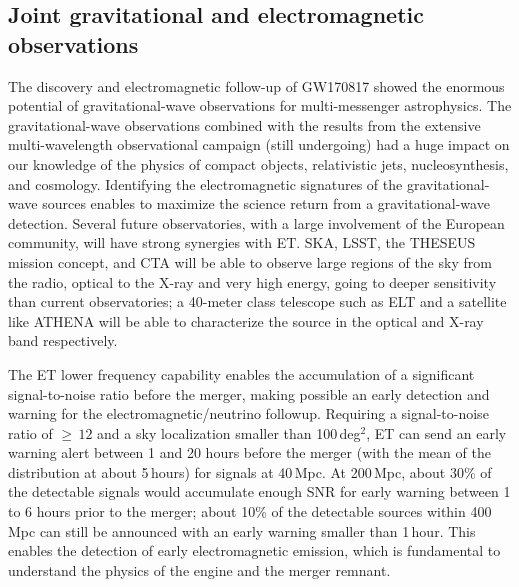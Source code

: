 \subsection{Joint gravitational and electromagnetic observations}
\label{sec:MM-EM}

The discovery and electromagnetic follow-up of GW170817 showed the enormous potential  of gravitational-wave observations for multi-messenger astrophysics. The gravitational-wave observations combined with the results from the extensive multi-wavelength observational campaign (still undergoing) had a huge impact on our knowledge of the physics of compact objects, relativistic jets, nucleosynthesis, and cosmology. Identifying the electromagnetic signatures of the gravitational-wave sources enables to maximize the science return from a gravitational-wave detection.  
Several future observatories, with a large involvement of the European community, will have strong synergies with ET. SKA, LSST, the THESEUS mission concept, and CTA will be able to observe large regions of the sky from the radio, optical to the X-ray and very high energy, going to deeper sensitivity than current observatories; a 40-meter class telescope such as ELT and a satellite like ATHENA will be able to characterize the source in the optical and X-ray band respectively. 

The ET lower frequency capability enables 
the accumulation of a significant signal-to-noise ratio before the merger, making possible an early detection and warning for the electromagnetic/neutrino followup. Requiring a signal-to-noise ratio of $\geq\,12$ and a sky localization smaller than 100\,deg$^2$, ET can send an early warning alert between 1 and 20 hours before the merger (with the mean of the distribution at about 5\,hours) for signals at 40\,Mpc. 
At 200\,Mpc, about 30\% of the detectable signals would accumulate enough SNR for early warning between 1 to 6 hours prior to the merger; about 10\% of the detectable sources within 400\,Mpc can still be announced with an early warning smaller than 1\,hour. This enables the detection of early electromagnetic emission, which is fundamental to understand the physics of the engine and the merger remnant.



